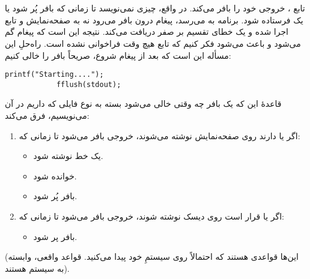 \section{}
\paragraph{}\label{answer:68}
 تابع ، خروجی خود را بافر می‌کند. در واقع، چیزی نمی‌نویسد تا زمانی که بافر پُر شود یا یک  فرستاده شود. برنامه به  می‌رسد، پیغام  درون بافر می‌رود نه به صفحه‌نمایش و تابع  اجرا شده و یک خطای تقسیم بر صفر دریافت می‌کند. نتیجه این است که پیغام  گم می‌شود و باعث می‌شود فکر کنیم که تابع  هیچ وقت فراخوانی نشده است. راه‌حلِ این مسأله این است که بعد از پیغام شروع، صریحاً بافر را خالی کنیم:
\begin{LTR}
        \begin{lstlisting}[style=C++Style]
            printf("Starting....");
            fflush(stdout);
        \end{lstlisting}
\end{LTR}

قاعدهٔ این که یک بافر چه وقتی خالی می‌شود بسته به نوع فایلی که داریم در آن می‌نویسیم، فرق می‌کند:
\begin{enumerate}
    \item اگر  یا  دارند روی صفحه‌نمایش نوشته می‌شوند، خروجی بافر می‌شود تا زمانی که:
        \begin{itemize}
            \item  یک خط نوشته شود.
            \item {} خوانده شود.
            \item بافر پُر شود.
        \end{itemize}

    \item اگر  یا  قرار است روی دیسک نوشته شوند، خروجی بافر می‌شود تا زمانی که:
        \begin{itemize}
            \item  بافر پر شود.
        \end{itemize}
\end{enumerate}

(این‌ها قواعدی هستند که احتمالاً روی سیستمِ خود پیدا می‌کنید. قواعد واقعی، وابسته به سیستم هستند).
